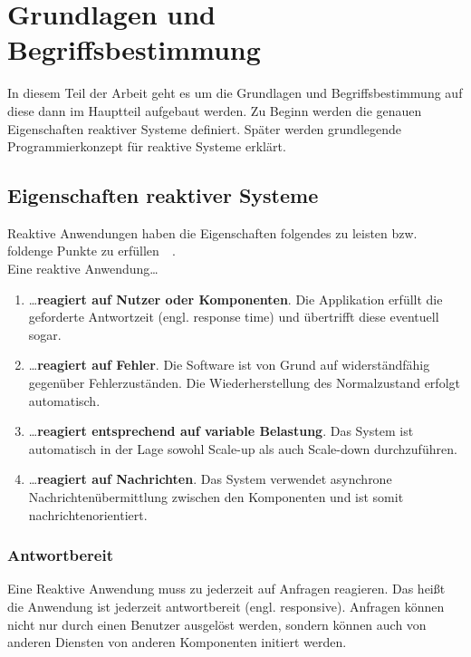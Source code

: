 \chapter{Grundlagen und Begriffsbestimmung}

In diesem Teil der Arbeit geht es um die Grundlagen und Begriffsbestimmung auf diese dann im Hauptteil aufgebaut werden. Zu Beginn werden die genauen Eigenschaften reaktiver Systeme definiert. Später werden grundlegende Programmierkonzept für reaktive Systeme erklärt.

\section{Eigenschaften reaktiver Systeme}

Reaktive Anwendungen haben die Eigenschaften folgendes zu leisten bzw. foldenge Punkte zu erfüllen~\cite[S.~19ff]{kuhn_reactive_2015}~\cite[S.~6]{vernon_reactive_2016}.\\
Eine reaktive Anwendung\ldots

\begin{enumerate}
    \item \ldots \textbf{reagiert auf Nutzer oder Komponenten}. Die Applikation erfüllt die geforderte Antwortzeit (engl. response time) und übertrifft diese eventuell sogar.
    \item \ldots \textbf{reagiert auf Fehler}. Die Software ist von Grund auf widerständfähig gegenüber Fehlerzuständen. Die Wiederherstellung des Normalzustand erfolgt automatisch.
    \item \ldots \textbf{reagiert entsprechend auf variable Belastung}. Das System ist automatisch in der Lage sowohl Scale-up als auch Scale-down durchzuführen.
    \item \ldots \textbf{reagiert auf Nachrichten}. Das System verwendet asynchrone Nachrichtenübermittlung zwischen den Komponenten und ist somit nachrichtenorientiert.
\end{enumerate}

\subsection{Antwortbereit}\label{subsec:responsive}
Eine Reaktive Anwendung muss zu jederzeit auf Anfragen reagieren. Das heißt die Anwendung ist jederzeit antwortbereit (engl. responsive). Anfragen können nicht nur durch einen Benutzer ausgelöst werden, sondern können auch von anderen Diensten von anderen Komponenten initiert werden.

